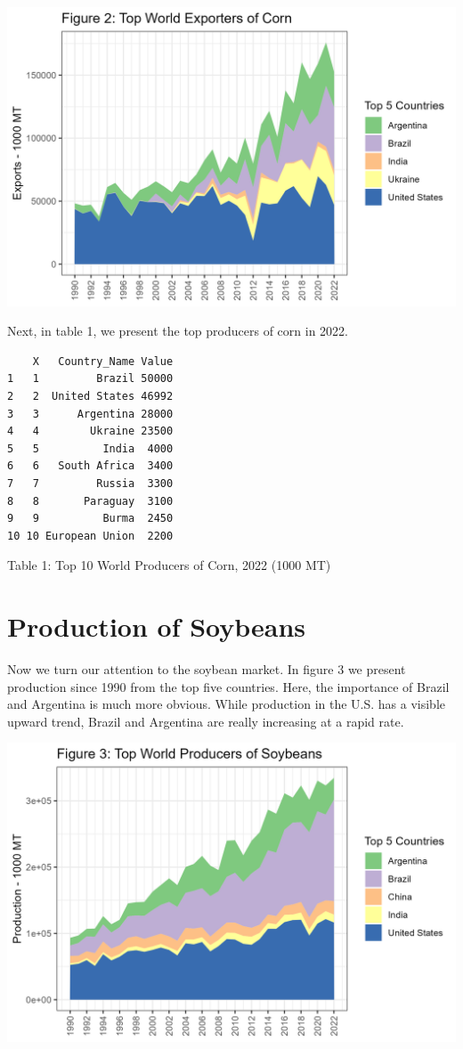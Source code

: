 \documentclass[
  letterpaper,
  DIV=11,
  numbers=noendperiod]{scrreprt}
\begin{document}
\includegraphics{assets/SouthAmericanProduction_TopExporterCorn.png}

Next, in table 1, we present the top producers of corn in 2022.

\begin{verbatim}
    X   Country_Name Value
1   1         Brazil 50000
2   2  United States 46992
3   3      Argentina 28000
4   4        Ukraine 23500
5   5          India  4000
6   6   South Africa  3400
7   7         Russia  3300
8   8       Paraguay  3100
9   9          Burma  2450
10 10 European Union  2200
\end{verbatim}

Table 1: Top 10 World Producers of Corn, 2022 (1000 MT)

\hypertarget{production-of-soybeans}{%
\section{Production of Soybeans}\label{production-of-soybeans}}

Now we turn our attention to the soybean market. In figure 3 we present
production since 1990 from the top five countries. Here, the importance
of Brazil and Argentina is much more obvious. While production in the
U.S. has a visible upward trend, Brazil and Argentina are really
increasing at a rapid rate.

\includegraphics{assets/SouthAmericanProd_TopProdSoy.png}
\end{document}
